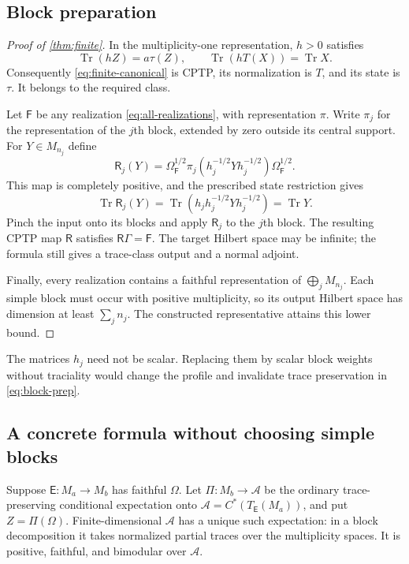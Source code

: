 \documentclass[11pt,reqno]{amsart}
\theoremstyle{definition}
\theoremstyle{remark}
\numberwithin{equation}{section}
\DeclareMathOperator{\Tr}{Tr}
\newcommand{\A}{\mathcal A}
\newcommand{\E}{\mathsf E}
\newcommand{\F}{\mathsf F}
\newcommand{\R}{\mathsf R}
\begin{document}
\subsection{Block preparation}

\begin{proof}[Proof of \cref{thm:finite}]
In the multiplicity-one representation, $h>0$ satisfies
\[
 \Tr(hZ)=a\tau(Z),\qquad \Tr(hT(X))=\Tr X.
\]
Consequently \eqref{eq:finite-canonical} is CPTP, its normalization is $T$, and its state is $\tau$. It belongs to the required class.

Let $\F$ be any realization \eqref{eq:all-realizations}, with representation $\pi$. Write $\pi_j$ for the representation of the $j$th block, extended by zero outside its central support. For $Y\in M_{n_j}$ define
\begin{equation}\label{eq:block-prep}
 \R_j(Y)=\Omega_\F^{1/2}
 \pi_j(h_j^{-1/2}Yh_j^{-1/2})\Omega_\F^{1/2}.
\end{equation}
This map is completely positive, and the prescribed state restriction gives
\[
 \Tr\R_j(Y)
 =\Tr(h_jh_j^{-1/2}Yh_j^{-1/2})=\Tr Y.
\]
Pinch the input onto its blocks and apply $\R_j$ to the $j$th block. The resulting CPTP map $\R$ satisfies $\R\Gamma=\F$. The target Hilbert space may be infinite; the formula still gives a trace-class output and a normal adjoint.

Finally, every realization contains a faithful representation of $\bigoplus_jM_{n_j}$. Each simple block must occur with positive multiplicity, so its output Hilbert space has dimension at least $\sum_jn_j$. The constructed representative attains this lower bound.
\end{proof}

The matrices $h_j$ need not be scalar. Replacing them by scalar block weights without traciality would change the profile and invalidate trace preservation in \eqref{eq:block-prep}.

\subsection{A concrete formula without choosing simple blocks}

Suppose $\E:M_a\to M_b$ has faithful $\Omega$. Let $\Pi:M_b\to\A$ be the ordinary trace-preserving conditional expectation onto $\A=C^*(T_\E(M_a))$, and put $Z=\Pi(\Omega)$. Finite-dimensional $\A$ has a unique such expectation: in a block decomposition it takes normalized partial traces over the multiplicity spaces. It is positive, faithful, and bimodular over $\A$.
\end{document}
